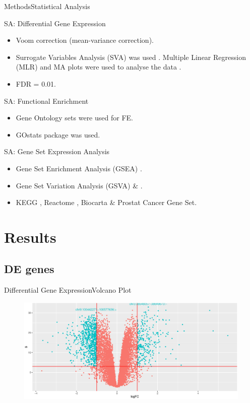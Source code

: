 \documentclass{beamer}
\begin{document}
\begin{frame}{Methods}{Statistical Analysis}
	\begin{block}{SA: Differential Gene Expression}
		\begin{itemize}
			\item Voom correction (mean-variance correction).
			\item Surrogate Variables Analysis (SVA) was used \cite{leek2007capturing} \cite{svamanual}. Multiple Linear Regression (MLR)  and MA plots were used to analyse the data \cite{limma}.
			\item FDR = 0.01.
		\end{itemize}
	\end{block}
	\begin{block}{SA: Functional Enrichment}
		\begin{itemize}
			\item Gene Ontology sets were used for FE.
			\item GOstats package \cite{GOstats} was used.
		\end{itemize}
	\end{block}
	\begin{block}{SA: Gene Set Expression Analysis}
		\begin{itemize}
			\item Gene Set Enrichment Analysis (GSEA) \cite{GSEABase}.
			\item Gene Set Variation Analysis (GSVA) \cite{GSVA} \& \cite{GSVAdata}.
			\item KEGG \cite{kanehisa2016kegg}, Reactome \cite{fabregat2016reactome}, Biocarta \cite{nishimura2001biocarta} \& Prostat Cancer Gene Set.
		\end{itemize}
	\end{block}	
\end{frame}


\section{Results}


\subsection{DE genes}

\begin{frame}{Differential Gene Expression}{Volcano Plot}

   \begin{figure}
        \includegraphics[width=1\textwidth]{Volcano.eps}
    \end{figure}

\end{frame}
\end{document}
